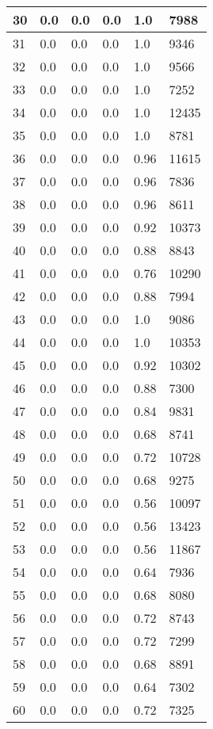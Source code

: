 \begin{longtable}{|l|l|l|l|l|l|}
30 & 0.0 & 0.0 & 0.0 & 1.0 & 7988 \\ \hline 
31 & 0.0 & 0.0 & 0.0 & 1.0 & 9346 \\ \hline 
32 & 0.0 & 0.0 & 0.0 & 1.0 & 9566 \\ \hline 
33 & 0.0 & 0.0 & 0.0 & 1.0 & 7252 \\ \hline 
34 & 0.0 & 0.0 & 0.0 & 1.0 & 12435 \\ \hline 
35 & 0.0 & 0.0 & 0.0 & 1.0 & 8781 \\ \hline 
36 & 0.0 & 0.0 & 0.0 & 0.96 & 11615 \\ \hline 
37 & 0.0 & 0.0 & 0.0 & 0.96 & 7836 \\ \hline 
38 & 0.0 & 0.0 & 0.0 & 0.96 & 8611 \\ \hline 
39 & 0.0 & 0.0 & 0.0 & 0.92 & 10373 \\ \hline 
40 & 0.0 & 0.0 & 0.0 & 0.88 & 8843 \\ \hline 
41 & 0.0 & 0.0 & 0.0 & 0.76 & 10290 \\ \hline 
42 & 0.0 & 0.0 & 0.0 & 0.88 & 7994 \\ \hline 
43 & 0.0 & 0.0 & 0.0 & 1.0 & 9086 \\ \hline 
44 & 0.0 & 0.0 & 0.0 & 1.0 & 10353 \\ \hline 
45 & 0.0 & 0.0 & 0.0 & 0.92 & 10302 \\ \hline 
46 & 0.0 & 0.0 & 0.0 & 0.88 & 7300 \\ \hline 
47 & 0.0 & 0.0 & 0.0 & 0.84 & 9831 \\ \hline 
48 & 0.0 & 0.0 & 0.0 & 0.68 & 8741 \\ \hline 
49 & 0.0 & 0.0 & 0.0 & 0.72 & 10728 \\ \hline 
50 & 0.0 & 0.0 & 0.0 & 0.68 & 9275 \\ \hline 
51 & 0.0 & 0.0 & 0.0 & 0.56 & 10097 \\ \hline 
52 & 0.0 & 0.0 & 0.0 & 0.56 & 13423 \\ \hline 
53 & 0.0 & 0.0 & 0.0 & 0.56 & 11867 \\ \hline 
54 & 0.0 & 0.0 & 0.0 & 0.64 & 7936 \\ \hline 
55 & 0.0 & 0.0 & 0.0 & 0.68 & 8080 \\ \hline 
56 & 0.0 & 0.0 & 0.0 & 0.72 & 8743 \\ \hline 
57 & 0.0 & 0.0 & 0.0 & 0.72 & 7299 \\ \hline 
58 & 0.0 & 0.0 & 0.0 & 0.68 & 8891 \\ \hline 
59 & 0.0 & 0.0 & 0.0 & 0.64 & 7302 \\ \hline 
60 & 0.0 & 0.0 & 0.0 & 0.72 & 7325 \\ \hline 

\end{longtable}
